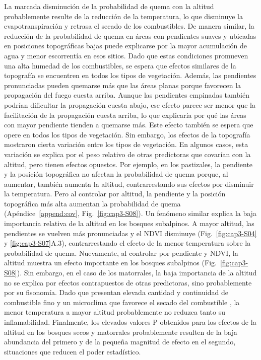 La marcada disminución de la probabilidad de quema con la altitud probablemente resulte de la reducción de la temperatura, lo que disminuye la evapotranspiración y retrasa el secado de los combustibles. De manera similar, la reducción de la probabilidad de quema en áreas con pendientes suaves y ubicadas en posiciones topográficas bajas puede explicarse por la mayor acumulación de agua y menor escorrentía en esos sitios. Dado que estas condiciones promueven una alta humedad de los combustibles, se espera que efectos similares de la topografía se encuentren en todos los tipos de vegetación. Además, las pendientes pronunciadas pueden quemarse más que las áreas planas porque favorecen la propagación del fuego cuesta arriba. Aunque las pendientes empinadas también podrían dificultar la propagación cuesta abajo, ese efecto parece ser menor que la facilitación de la propagación cuesta arriba, lo que explicaría por qué las áreas con mayor pendiente tienden a quemarse más. Este efecto también se espera que opere en todos los tipos de vegetación. Sin embargo, los efectos de la topografía mostraron cierta variación entre los tipos de vegetación. En algunos casos, esta variación se explica por el peso relativo de otras predictoras que covarían con la altitud, pero tienen efectos opuestos. Por ejemplo, en los pastizales, la pendiente y la posición topográfica no afectan la probabilidad de quema porque, al aumentar, también aumenta la altitud, contrarrestando sus efectos por disminuir la temperatura. Pero al controlar por altitud, la pendiente y la posición topográfica más alta aumentan la probabilidad de quema (Apéndice~\ref{append:cov}, Fig.~\ref{fig:cap3-S08}). Un fenómeno similar explica la baja importancia relativa de la altitud en los bosques subalpinos. A mayor altitud, las pendientes se vuelven más pronunciadas y el NDVI disminuye (Fig.~\ref{fig:cap3-S04} y \ref{fig:cap3-S07}A.3), contrarrestando el efecto de la menor temperatura sobre la probabilidad de quema. Nuevamente, al controlar por pendiente y NDVI, la altitud muestra un efecto importante en los bosques subalpinos (Fig.~\ref{fig:cap3-S08}). Sin embargo, en el caso de los matorrales, la baja importancia de la altitud no se explica por efectos contrapuestos de otras predictoras, sino probablemente por su fisonomía. Dado que presentan elevada cantidad y continuidad de combustible fino y un microclima que favorece el secado del combustible \citep{paritsis_positive_2015, tiribelli_changes_2018, barbera_microclimate_2023}, la menor temperatura a mayor altitud probablemente no reduzca tanto su inflamabilidad. Finalmente, los elevados valores P obtenidos para los efectos de la altitud en los bosques secos y matorrales probablemente resulten de la baja abundancia del primero y de la pequeña magnitud de efecto en el segundo, situaciones que reducen el poder estadístico.

